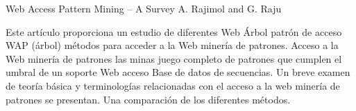 Web Access Pattern Mining – A Survey
A. Rajimol and G. Raju

Este artículo proporciona un estudio de diferentes Web Árbol patrón de acceso WAP (árbol) métodos para acceder a la Web minería de patrones. Acceso a la Web minería de patrones las minas juego completo de patrones que cumplen el umbral de un soporte Web acceso Base de datos de secuencias. Un breve examen de teoría básica y terminologías relacionadas con el acceso a la web minería de patrones se presentan. Una comparación de los diferentes métodos.


